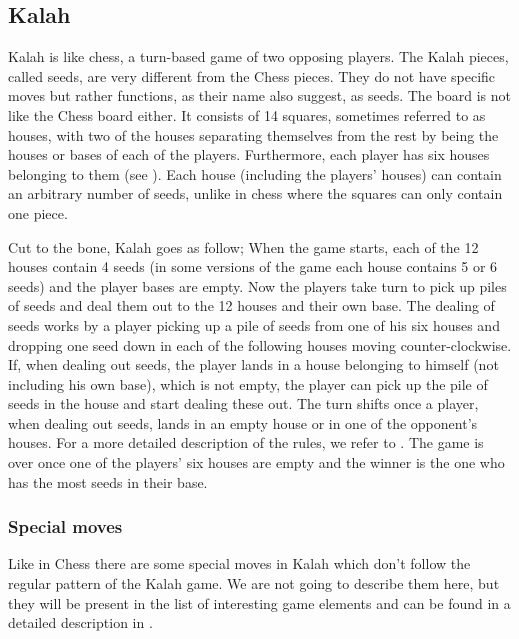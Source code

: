 \subsection{Kalah}

Kalah is like chess, a turn-based game of two opposing players. The Kalah pieces,
called seeds, are very different from the Chess pieces. They do not have
specific moves but rather functions, as their name also suggest, as seeds. The
board is not like the Chess board either. It consists of 14 squares, sometimes
referred to as houses,\cite{kalahrules} with two of the houses separating
themselves from the rest by being the houses or bases of each of the players.
Furthermore, each player has six houses belonging to them (see
). Each house (including the players' houses) can contain an
arbitrary number of seeds, unlike in chess where the squares can only contain
one piece.  

Cut to the bone, Kalah goes as follow; When the game starts, each of the 12
houses contain 4 seeds (in some versions of the game each house contains 5 or 6
seeds) and the player bases are empty. Now the players take turn to pick up
piles of seeds and deal them out to the 12 houses and their own base. The
dealing of seeds works by a player picking up a pile of seeds from one of his
six houses and dropping one seed down in each of the following houses moving
counter-clockwise. If, when dealing out seeds, the player lands in a house
belonging to himself (not including his own base), which is not empty, the
player can pick up the pile of seeds in the house and start dealing these out.
The turn shifts once a player, when dealing out seeds, lands in an empty house
or in one of the opponent's houses. For a more detailed description of the
rules, we refer to \cite{kalahrules}. The game is over once one of the players'
six houses are empty and the winner is the one who has the most seeds in their
base.


\subsubsection{Special moves}
Like in Chess there are some special moves in Kalah which don't follow the
regular pattern of the Kalah game. We are not going to describe them here, but
they will be present in the list of interesting game elements and can be found
in a detailed description in \cite{kalahrules}.

